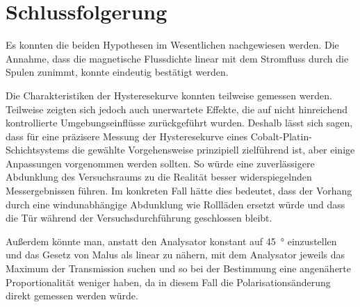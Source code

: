 \documentclass[
	a4paper,
	12pt,
	pagesize,
	ngerman
]{scrartcl}
\begin{document}
	\section{Schlussfolgerung}
	Es konnten die beiden Hypothesen im Wesentlichen nachgewiesen werden.
	Die Annahme, dass die magnetische Flussdichte linear mit dem Stromfluss durch die Spulen zunimmt, konnte eindeutig bestätigt werden.
	
	Die Charakteristiken der Hysteresekurve konnten teilweise gemessen werden.
	Teilweise zeigten sich jedoch auch unerwartete Effekte, die auf nicht hinreichend kontrollierte Umgebungseinflüsse zurückgeführt wurden.
	Deshalb lässt sich sagen, dass für eine präzisere Messung der Hysteresekurve eines Cobalt-Platin-Schichtsystems die gewählte Vorgehensweise prinzipiell zielführend ist, aber einige Anpassungen vorgenommen werden sollten.
	So würde eine zuverlässigere Abdunklung des Versuchsraums zu die Realität besser widerspiegelnden Messergebnissen führen.
	Im konkreten Fall hätte dies bedeutet, dass der Vorhang durch eine windunabhängige Abdunklung wie Rollläden ersetzt würde und dass die Tür während der Versuchsdurchführung geschlossen bleibt.
	
	Außerdem könnte man, anstatt den Analysator konstant auf \SI{45}{\degree} einzustellen und das Gesetz von Malus als linear zu nähern, mit dem Analysator jeweils das Maximum der Transmission suchen und so bei der Bestimmung eine angenäherte Proportionalität weniger haben, da in diesem Fall die Polarisationsänderung direkt gemessen werden würde. %
\end{document}
